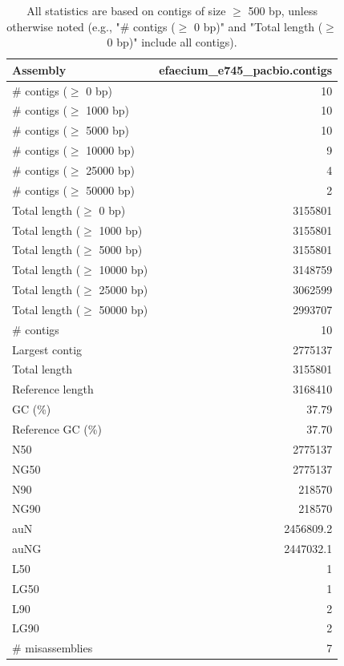 \documentclass[12pt,a4paper]{article}
\begin{document}
\begin{table}[ht]
\begin{center}
\caption{All statistics are based on contigs of size $\geq$ 500 bp, unless otherwise noted (e.g., "\# contigs ($\geq$ 0 bp)" and "Total length ($\geq$ 0 bp)" include all contigs).}
\begin{tabular}{|l*{1}{|r}|}
\hline
Assembly & efaecium\_e745\_pacbio.contigs \\ \hline
\# contigs ($\geq$ 0 bp) & 10 \\ \hline
\# contigs ($\geq$ 1000 bp) & 10 \\ \hline
\# contigs ($\geq$ 5000 bp) & 10 \\ \hline
\# contigs ($\geq$ 10000 bp) & 9 \\ \hline
\# contigs ($\geq$ 25000 bp) & 4 \\ \hline
\# contigs ($\geq$ 50000 bp) & 2 \\ \hline
Total length ($\geq$ 0 bp) & 3155801 \\ \hline
Total length ($\geq$ 1000 bp) & 3155801 \\ \hline
Total length ($\geq$ 5000 bp) & 3155801 \\ \hline
Total length ($\geq$ 10000 bp) & 3148759 \\ \hline
Total length ($\geq$ 25000 bp) & 3062599 \\ \hline
Total length ($\geq$ 50000 bp) & 2993707 \\ \hline
\# contigs & 10 \\ \hline
Largest contig & 2775137 \\ \hline
Total length & 3155801 \\ \hline
Reference length & 3168410 \\ \hline
GC (\%) & 37.79 \\ \hline
Reference GC (\%) & 37.70 \\ \hline
N50 & 2775137 \\ \hline
NG50 & 2775137 \\ \hline
N90 & 218570 \\ \hline
NG90 & 218570 \\ \hline
auN & 2456809.2 \\ \hline
auNG & 2447032.1 \\ \hline
L50 & 1 \\ \hline
LG50 & 1 \\ \hline
L90 & 2 \\ \hline
LG90 & 2 \\ \hline
\# misassemblies & 7 \\ \hline

\end{tabular}
\end{center}
\end{table}
\end{document}

